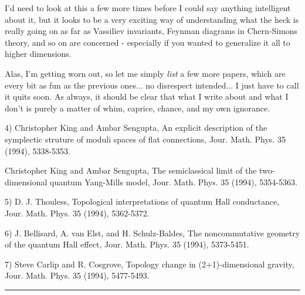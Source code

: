 I'd need to look at this a few more times before I could say
anything intelligent about it, but it looks to be a very exciting
way of understanding what the heck is really going on as far
as Vassiliev invariants, Feynman diagrams in Chern-Simons theory,
and so on are concerned - especially if you wanted to generalize
it all to higher dimensions.

Alas, I'm getting worn out, so let me simply \emph{list} a few more
papers, which are every bit as fun as the previous ones... no
disrespect intended... I just have to call it quits soon.  As
always, it should be clear that what I write about and what I 
don't is purely a matter of whim, caprice, chance, and my own
ignorance.  

4) Christopher King and Ambar Sengupta, 
An explicit description of the symplectic struture of moduli
spaces of flat connections, Jour.  Math. Phys. 35 (1994), 5338-5353.

Christopher King and Ambar Sengupta, 
The semiclassical limit of the two-dimensional quantum Yang-Mills
model, Jour. Math. Phys. 35 (1994), 5354-5363.

5) D. J. Thouless, 
Topological interpretations of quantum Hall conductance, 
Jour. Math. Phys. 35 (1994), 5362-5372.

6) J. Bellisard, A. van Elst, and H. Schulz-Baldes, 
The noncommutative geometry of the quantum Hall effect, 
Jour. Math. Phys. 35 (1994),
5373-5451.

7) Steve Carlip and R. Cosgrove, 
Topology change in (2+1)-dimensional gravity, 
Jour. Math. Phys. 35 (1994), 5477-5493.

\par\noindent\rule{\textwidth}{0.4pt}
